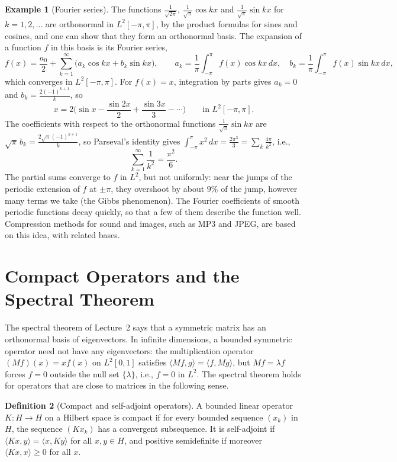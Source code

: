 \documentclass[11pt]{article}
\newcommand{\ip}[2]{\langle #1, #2 \rangle}
\theoremstyle{definition}
\newtheorem{definition}{Definition}[section]
\newtheorem{example}[definition]{Example}
\theoremstyle{plain}
\theoremstyle{remark}
\begin{document}
\begin{example}[Fourier series]\label{ex:fourier}
    The functions $\frac{1}{\sqrt{2\pi}}$, $\frac{1}{\sqrt{\pi}}\cos kx$ and $\frac{1}{\sqrt{\pi}}\sin kx$ for $k = 1, 2, \ldots$ are orthonormal in $L^2[-\pi, \pi]$, by the product formulas for sines and cosines, and one can show that they form an orthonormal basis. The expansion of a function $f$ in this basis is its Fourier series,
    \[f(x) = \frac{a_0}{2} + \sum_{k=1}^\infty \big(a_k\cos kx + b_k\sin kx\big), \qquad a_k = \frac{1}{\pi}\int_{-\pi}^\pi f(x)\cos kx\, dx, \quad b_k = \frac{1}{\pi}\int_{-\pi}^\pi f(x)\sin kx\, dx,\]
    which converges in $L^2[-\pi, \pi]$. For $f(x) = x$, integration by parts gives $a_k = 0$ and $b_k = \frac{2(-1)^{k+1}}{k}$, so
    \[x = 2\Big(\sin x - \frac{\sin 2x}{2} + \frac{\sin 3x}{3} - \cdots\Big) \qquad \text{in } L^2[-\pi, \pi].\]
    The coefficients with respect to the orthonormal functions $\frac{1}{\sqrt{\pi}}\sin kx$ are $\sqrt{\pi}\,b_k = \frac{2\sqrt{\pi}(-1)^{k+1}}{k}$, so Parseval's identity gives $\int_{-\pi}^\pi x^2\, dx = \frac{2\pi^3}{3} = \sum_k \frac{4\pi}{k^2}$, i.e.,
    \[\sum_{k=1}^\infty \frac{1}{k^2} = \frac{\pi^2}{6}.\]
    The partial sums converge to $f$ in $L^2$, but not uniformly: near the jumps of the periodic extension of $f$ at $\pm\pi$, they overshoot by about $9\%$ of the jump, however many terms we take (the Gibbs phenomenon). The Fourier coefficients of smooth periodic functions decay quickly, so that a few of them describe the function well. Compression methods for sound and images, such as MP3 and JPEG, are based on this idea, with related bases.
\end{example}

\section{Compact Operators and the Spectral Theorem}\label{sec:compact-operators}

The spectral theorem of Lecture~2 says that a symmetric matrix has an orthonormal basis of eigenvectors. In infinite dimensions, a bounded symmetric operator need not have any eigenvectors: the multiplication operator $(Mf)(x) = xf(x)$ on $L^2[0, 1]$ satisfies $\ip{Mf}{g} = \ip{f}{Mg}$, but $Mf = \lambda f$ forces $f = 0$ outside the null set $\{\lambda\}$, i.e., $f = 0$ in $L^2$. The spectral theorem holds for operators that are close to matrices in the following sense.

\begin{definition}[Compact and self-adjoint operators]\label{def:compact-operator}
    A bounded linear operator $K: H \to H$ on a Hilbert space is compact if for every bounded sequence $(x_k)$ in $H$, the sequence $(Kx_k)$ has a convergent subsequence. It is self-adjoint if $\ip{Kx}{y} = \ip{x}{Ky}$ for all $x, y \in H$, and positive semidefinite if moreover $\ip{Kx}{x} \geq 0$ for all $x$.
\end{definition}
\end{document}
